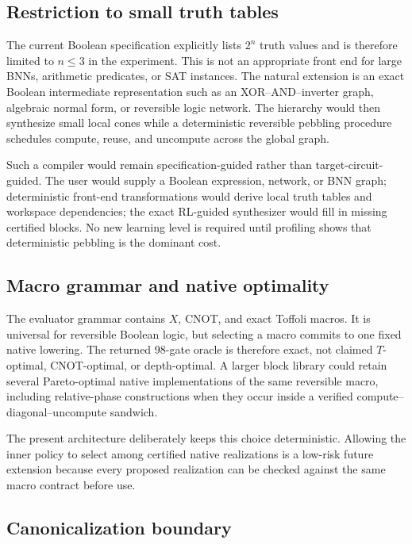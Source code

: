 \subsection{Restriction to small truth tables}

The current Boolean specification explicitly lists $2^n$ truth values and is therefore limited to $n\leq3$ in the experiment.  This is not an appropriate front end for large BNNs, arithmetic predicates, or SAT instances.  The natural extension is an exact Boolean intermediate representation such as an XOR--AND--inverter graph, algebraic normal form, or reversible logic network.  The hierarchy would then synthesize small local cones while a deterministic reversible pebbling procedure schedules compute, reuse, and uncompute across the global graph.

Such a compiler would remain specification-guided rather than target-circuit-guided.  The user would supply a Boolean expression, network, or BNN graph; deterministic front-end transformations would derive local truth tables and workspace dependencies; the exact RL-guided synthesizer would fill in missing certified blocks.  No new learning level is required until profiling shows that deterministic pebbling is the dominant cost.

\subsection{Macro grammar and native optimality}

The evaluator grammar contains $X$, CNOT, and exact Toffoli macros.  It is universal for reversible Boolean logic, but selecting a macro commits to one fixed native lowering.  The returned 98-gate oracle is therefore exact, not claimed $T$-optimal, CNOT-optimal, or depth-optimal.  A larger block library could retain several Pareto-optimal native implementations of the same reversible macro, including relative-phase constructions when they occur inside a verified compute--diagonal--uncompute sandwich.

The present architecture deliberately keeps this choice deterministic.  Allowing the inner policy to select among certified native realizations is a low-risk future extension because every proposed realization can be checked against the same macro contract before use.

\subsection{Canonicalization boundary}

